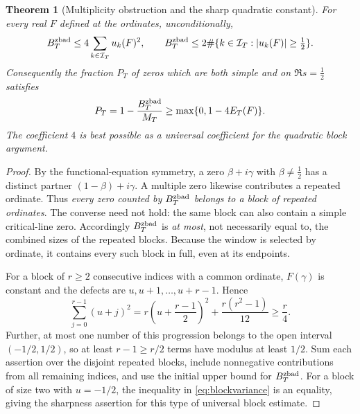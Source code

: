 \documentclass[11pt,reqno]{amsart}
\numberwithin{equation}{section}
\newtheorem{theorem}{Theorem}[section]
\begin{document}
\begin{theorem}[Multiplicity obstruction and the sharp quadratic constant]
\label{thm:blockcount}
For every real $F$ defined at the ordinates, unconditionally,
\begin{equation}\label{eq:blockmain}
  B_T^{\rm zbad}\le4\sum_{k\in\mathcal I_T}u_k(F)^2,
  \qquad
  B_T^{\rm zbad}\le2\#\{k\in\mathcal I_T:|u_k(F)|\ge\tfrac12\}.
\end{equation}
Consequently the fraction $P_T$ of zeros which are both simple and on
$\Re s=\tfrac12$ satisfies
\begin{equation}\label{eq:blockfraction}
 P_T=1-\frac{B_T^{\rm zbad}}{M_T}\ge
 \max\{0,1-4E_T(F)\}.
\end{equation}
The coefficient $4$ is best possible as a universal coefficient for the
quadratic block argument.
\end{theorem}
\begin{proof}
By the functional-equation symmetry, a zero
$\beta+i\gamma$ with $\beta\ne\tfrac12$ has a distinct partner
$(1-\beta)+i\gamma$.  A multiple zero likewise contributes a repeated
ordinate. Thus \emph{every zero counted by $B_T^{\rm zbad}$ belongs to a block of
repeated ordinates}.  The converse need not hold: the same block can also
contain a simple critical-line zero. Accordingly $B_T^{\rm zbad}$ is \emph{at most},
not necessarily equal to, the combined sizes of the repeated blocks.
Because the window is selected by ordinate, it contains every such block
in full, even at its endpoints.

For a block of $r\ge2$ consecutive indices with a common ordinate,
$F(\gamma)$ is constant and the defects are $u,u+1,\dots,u+r-1$. Hence
\begin{equation}\label{eq:blockvariance}
\sum_{j=0}^{r-1}(u+j)^2
=r\left(u+\frac{r-1}{2}\right)^2+\frac{r(r^2-1)}{12}
\ge\frac r4.
\end{equation}
Further, at most one number of this progression belongs to the open
interval $(-1/2,1/2)$, so at least $r-1\ge r/2$ terms have modulus at
least $1/2$.  Sum each assertion over the disjoint repeated blocks,
include nonnegative contributions from all remaining indices, and use
the initial upper bound for $B_T^{\rm zbad}$.
For a block of size two with $u=-1/2$, the inequality in
\eqref{eq:blockvariance} is an equality, giving the sharpness assertion
for this type of universal block estimate.
\end{proof}
\end{document}
